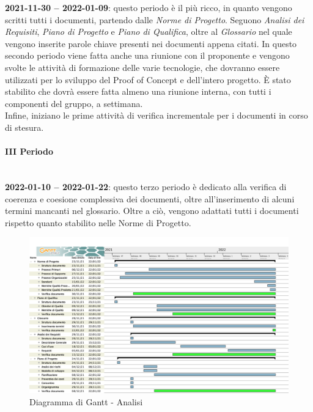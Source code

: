 \textbf{2021-11-30 – 2022-01-09}: questo periodo è il più ricco, in quanto vengono scritti tutti i documenti, partendo dalle \textit{Norme di Progetto}. Seguono \textit{Analisi dei Requisiti}, \textit{Piano di Progetto} e \textit{Piano di Qualifica}, oltre al \textit{Glossario} nel quale vengono inserite parole chiave presenti nei documenti appena citati. In questo secondo periodo viene fatta anche una riunione con il proponente e vengono svolte le attività di formazione delle varie tecnologie, che dovranno essere utilizzati per lo sviluppo del Proof of Concept e dell’intero progetto. È stato stabilito che dovrà essere fatta almeno una riunione interna, con tutti i componenti del gruppo, a settimana. \\
Infine, iniziano le prime attività di verifica incrementale per i documenti in corso di stesura. 

\paragraph{III Periodo} \mbox{} \\

\textbf{2022-01-10 – 2022-01-22}: questo terzo periodo è dedicato alla verifica di coerenza e coesione complessiva dei documenti, oltre all’inserimento di alcuni termini mancanti nel glossario. Oltre a ciò, vengono adattati tutti i documenti rispetto quanto stabilito nelle Norme di Progetto.

\begin{figure}[H]
\centering
\includegraphics[scale=0.35]{Sezioni/gantt/Analisi.png}
\caption{Diagramma di Gantt - Analisi}
\end{figure}
